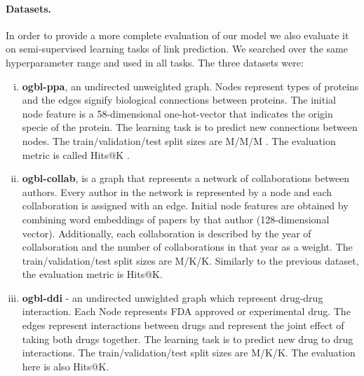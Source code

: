 \documentclass{article} \usepackage{iclr2021_conference,times}
\begin{document}
\paragraph{Datasets.} In order to provide a more complete evaluation of our model we also evaluate it on semi-supervised learning tasks of link prediction. We searched over the same hyperparameter range  and used  in all tasks. The three datasets were:
\begin{enumerate}[(i)]
    \item \textbf{ogbl-ppa}, an undirected unweighted graph. Nodes represent types of proteins and the edges signify biological connections between proteins. The initial node feature is a 58-dimensional one-hot-vector that indicates the origin specie of the protein. The learning task is to predict new connections between nodes. The train/validation/test split sizes are M/M/M
    . The evaluation metric is called Hits@K \citep{Hu2020}.
    
    \item \textbf{ogbl-collab}, is a graph that represents a network of collaborations between authors. Every author in the network is represented by a node and each collaboration is assigned with an edge. Initial node features are obtained by combining word embeddings of papers by that author (128-dimensional vector). Additionally, each collaboration is described by the year of collaboration and the number of collaborations in that year as a weight. The train/validation/test split sizes are M/K/K. Similarly to the previous dataset, the evaluation metric is Hits@K. 
    \item \textbf{ogbl-ddi} - an undirected  unwighted graph which represent drug-drug interaction. Each Node represents FDA approved or experimental drug. The edges represent interactions between drugs and represent the joint effect of taking both drugs together. The learning task is to predict new drug to drug interactions. The train/validation/test split sizes are M/K/K. The evaluation here is also Hits@K. 
\end{enumerate}
\end{document}
